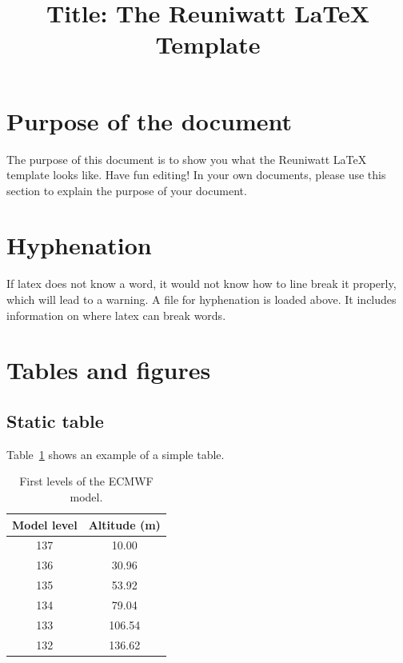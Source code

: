 \documentclass[a4paper,12pt]{article}
\title{Title: The Reuniwatt LaTeX Template}
\begin{document}

\maketitle
\addtocounter{page}{1}

\begin{versionhistory}
\end{versionhistory}
\setcounter{table}{0}
\newpage
\tableofcontents
\newpage

\section*{Purpose of the document}

The purpose of this document is to show you what the Reuniwatt LaTeX template looks like. Have fun editing! In your own documents, please use this section to explain the purpose of your document.

\newpage

\section{Hyphenation}

If latex does not know a word, it would not know how to line break it properly, which will lead to a warning. A file for hyphenation is loaded above. It includes information on where latex can break words.

\section{Tables and figures}

\subsection{Static table}

Table~\ref{tab:model_levels} shows an example of a simple table.

\begin{table}[!htb]
  \centering
  \begin{tabular}{cc}
  \hline
  \hline
  Model level & Altitude (m)  \\ \hline
  137 & 10.00 \\
  \hline
  136 & 30.96 \\
  \hline
  135 & 53.92 \\
  \hline
  134 & 79.04 \\
  \hline
  133 & 106.54 \\
  \hline
  132 & 136.62 \\
  \hline
  \hline
  \end{tabular}
  \caption{First levels of the ECMWF model.}
  \label{tab:model_levels}
\end{table}
\end{document}
